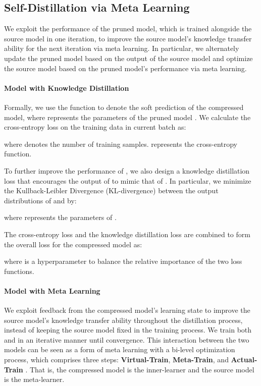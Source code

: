 \documentclass[11pt]{article}
\begin{document}
\subsection{Self-Distillation via Meta Learning}
We exploit the performance of the pruned model, which is trained alongside the source model in one iteration, to improve the source model's knowledge transfer ability for the next iteration via meta learning. 
In particular, we alternately update the pruned model  based on the output of the source model  and optimize the source model  based on the pruned model's performance via meta learning. 

\paragraph{Model  with Knowledge Distillation}
Formally, we use the function  to denote the soft prediction of the compressed model, where  represents the parameters of the pruned model . We calculate the cross-entropy loss  on the training data in current batch as:

where  denotes the number of training samples.  represents the cross-entropy function. 

To further improve the performance of , we also design a knowledge distillation loss   that encourages the output of  to mimic that of . In particular, we minimize the Kullback-Leibler Divergence (KL-divergence) between the output distributions of  and  by:

where  represents the parameters of  .

The cross-entropy loss  and the knowledge distillation loss  are combined to form the overall loss  for the compressed model  as:

where  is a hyperparameter to balance the relative importance of the two loss functions. 




\paragraph{Model  with Meta Learning}
We exploit feedback from the compressed model's learning
state to improve the source model's knowledge transfer ability throughout the distillation process, instead of keeping the source model  fixed in the training process. 
We train both  and  in an iterative manner until convergence. This interaction between the two models can be seen as a form of meta learning with a bi-level optimization process, which comprises three steps: \textbf{Virtual-Train}, \textbf{Meta-Train}, and \textbf{Actual-Train} \cite{xu2021faster}.
That is, the compressed model  is the inner-learner and the source model  is the meta-learner. 
\end{document}
